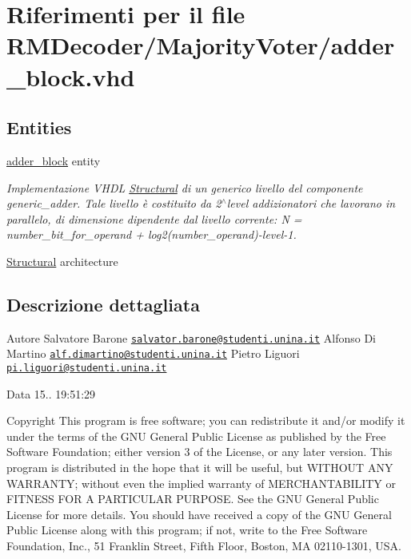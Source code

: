 \hypertarget{adder__block_8vhd}{\section{Riferimenti per il file R\+M\+Decoder/\+Majority\+Voter/adder\+\_\+block.vhd}
\label{adder__block_8vhd}
}
\subsection*{Entities}
\begin{DoxyCompactItemize}
\item 
\hyperlink{classadder__block}{adder\+\_\+block} entity
\begin{DoxyCompactList}\small\item\em Implementazione V\+H\+D\+L \hyperlink{classadder__block_1_1_structural}{Structural} di un generico livello del componente generic\+\_\+adder. Tale livello è costituito da 2$^\wedge$level addizionatori che lavorano in parallelo, di dimensione dipendente dal livello corrente\+: N = number\+\_\+bit\+\_\+for\+\_\+operand + log2(number\+\_\+operand)-\/level-\/1. \end{DoxyCompactList}\item 
\hyperlink{classadder__block_1_1_structural}{Structural} architecture
\end{DoxyCompactItemize}


\subsection{Descrizione dettagliata}
\begin{DoxyAuthor}{Autore}
Salvatore Barone \href{mailto:salvator.barone@studenti.unina.it}{\tt salvator.\+barone@studenti.\+unina.\+it} Alfonso Di Martino \href{mailto:alf.dimartino@studenti.unina.it}{\tt alf.\+dimartino@studenti.\+unina.\+it} Pietro Liguori \href{mailto:pi.liguori@studenti.unina.it}{\tt pi.\+liguori@studenti.\+unina.\+it} 
\end{DoxyAuthor}
\begin{DoxyDate}{Data}
15.. 19\+:51\+:29
\end{DoxyDate}
\begin{DoxyCopyright}{Copyright}
This program is free software; you can redistribute it and/or modify it under the terms of the G\+N\+U General Public License as published by the Free Software Foundation; either version 3 of the License, or any later version. This program is distributed in the hope that it will be useful, but W\+I\+T\+H\+O\+U\+T A\+N\+Y W\+A\+R\+R\+A\+N\+T\+Y; without even the implied warranty of M\+E\+R\+C\+H\+A\+N\+T\+A\+B\+I\+L\+I\+T\+Y or F\+I\+T\+N\+E\+S\+S F\+O\+R A P\+A\+R\+T\+I\+C\+U\+L\+A\+R P\+U\+R\+P\+O\+S\+E. See the G\+N\+U General Public License for more details. You should have received a copy of the G\+N\+U General Public License along with this program; if not, write to the Free Software Foundation, Inc., 51 Franklin Street, Fifth Floor, Boston, M\+A 02110-\/1301, U\+S\+A. 
\end{DoxyCopyright}
